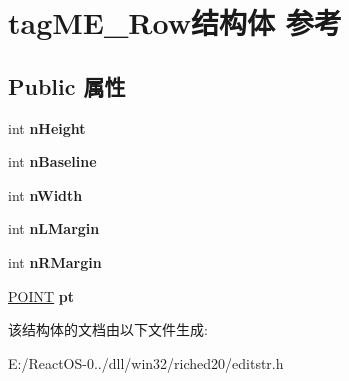 \hypertarget{structtag_m_e___row}{}\section{tag\+M\+E\+\_\+\+Row结构体 参考}
\label{structtag_m_e___row}
\subsection*{Public 属性}
\begin{DoxyCompactItemize}
\item 
\mbox{\label{structtag_m_e___row_aff417ac1276562d6520773b0a199bd6a}} 
int {\bfseries n\+Height}
\item 
\mbox{\label{structtag_m_e___row_a87231f3a56ad5e9c4fa00b66ca28c32d}} 
int {\bfseries n\+Baseline}
\item 
\mbox{\label{structtag_m_e___row_a0c3f799d7d3de3b1cef93452bd37583f}} 
int {\bfseries n\+Width}
\item 
\mbox{\label{structtag_m_e___row_ac47f1273bcd717d7267d15fb22d1ad50}} 
int {\bfseries n\+L\+Margin}
\item 
\mbox{\label{structtag_m_e___row_a657e698ca9856f1656721c5dd2c39a4b}} 
int {\bfseries n\+R\+Margin}
\item 
\mbox{\label{structtag_m_e___row_a9e60c7140d53c954a3838e0c43c990cc}} 
\hyperlink{structtag_p_o_i_n_t}{P\+O\+I\+NT} {\bfseries pt}
\end{DoxyCompactItemize}


该结构体的文档由以下文件生成\+:\begin{DoxyCompactItemize}
\item 
E\+:/\+React\+O\+S-\/0../dll/win32/riched20/editstr.\+h\end{DoxyCompactItemize}
